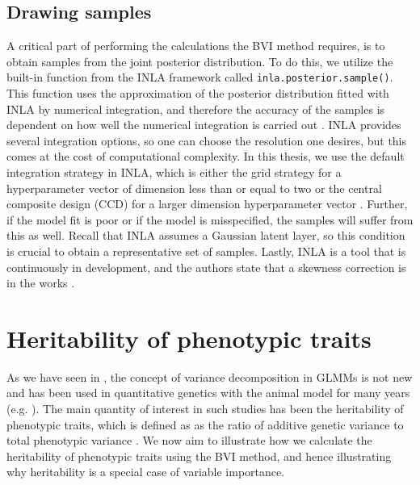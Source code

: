 \subsection{Drawing samples}
A critical part of performing the calculations the BVI method requires, is to obtain samples from the joint posterior distribution. To do this, we utilize the built-in function from the INLA framework called \texttt{inla.posterior.sample()}. This function uses the approximation of the posterior distribution fitted with INLA by numerical integration, and therefore the accuracy of the samples is dependent on how well the numerical integration is carried out \citep{gomezrubio2020inla}. INLA provides several integration options, so one can choose the resolution one desires, but this comes at the cost of computational complexity. In this thesis, we use the default integration strategy in INLA, which is either the grid strategy for a hyperparameter vector of dimension less than or equal to two or the central composite design (CCD) for a larger dimension hyperparameter vector \citep{martino2019inla}. Further, if the model fit is poor or if the model is misspecified, the samples will suffer from this as well. Recall that INLA assumes a Gaussian latent layer, so this condition is crucial to obtain a representative set of samples. Lastly, INLA is a tool that is continuously in development, and the authors state that a skewness correction is in the works \citep{gomezrubio2020inla}.  


\section{Heritability of phenotypic traits}
As we have seen in , the concept of variance decomposition in GLMMs is not new and has been used in quantitative genetics with the animal model for many years (e.g. \citet{Kruuk2004}). The main quantity of interest in such studies has been the heritability of phenotypic traits, which is defined as as the ratio of additive genetic variance to total phenotypic variance \citep{Wilson_heritability}. We now aim to illustrate how we calculate the heritability of phenotypic traits using the BVI method, and hence illustrating why heritability is a special case of variable importance.
